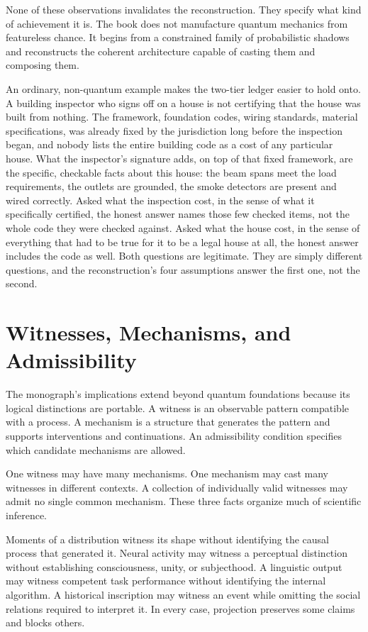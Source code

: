 \documentclass[12pt,openany]{book}
\begin{document}
None of these observations invalidates the reconstruction. They specify what kind of achievement it is. The book does not manufacture quantum mechanics from featureless chance. It begins from a constrained family of probabilistic shadows and reconstructs the coherent architecture capable of casting them and composing them.

An ordinary, non-quantum example makes the two-tier ledger easier to hold onto. A building inspector who signs off on a house is not certifying that the house was built from nothing. The framework, foundation codes, wiring standards, material specifications, was already fixed by the jurisdiction long before the inspection began, and nobody lists the entire building code as a cost of any particular house. What the inspector's signature adds, on top of that fixed framework, are the specific, checkable facts about this house: the beam spans meet the load requirements, the outlets are grounded, the smoke detectors are present and wired correctly. Asked what the inspection cost, in the sense of what it specifically certified, the honest answer names those few checked items, not the whole code they were checked against. Asked what the house cost, in the sense of everything that had to be true for it to be a legal house at all, the honest answer includes the code as well. Both questions are legitimate. They are simply different questions, and the reconstruction's four assumptions answer the first one, not the second.

\chapter{Witnesses, Mechanisms, and Admissibility}
The monograph's implications extend beyond quantum foundations because its logical distinctions are portable. A witness is an observable pattern compatible with a process. A mechanism is a structure that generates the pattern and supports interventions and continuations. An admissibility condition specifies which candidate mechanisms are allowed.

One witness may have many mechanisms. One mechanism may cast many witnesses in different contexts. A collection of individually valid witnesses may admit no single common mechanism. These three facts organize much of scientific inference.

Moments of a distribution witness its shape without identifying the causal process that generated it. Neural activity may witness a perceptual distinction without establishing consciousness, unity, or subjecthood. A linguistic output may witness competent task performance without identifying the internal algorithm. A historical inscription may witness an event while omitting the social relations required to interpret it. In every case, projection preserves some claims and blocks others.
\end{document}
